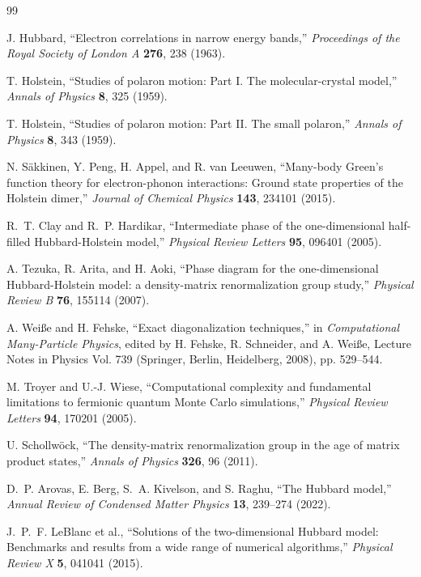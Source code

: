 \documentclass[
  reprint,
  amsmath,
  amssymb,
  aps,
  pra,
  nofootinbib,
  superscriptaddress,
  floatfix
]{revtex4-2}
\begin{document}
\begin{thebibliography}{99}

J. Hubbard,
``Electron correlations in narrow energy bands,''
\emph{Proceedings of the Royal Society of London A} \textbf{276}, 238 (1963).

T. Holstein,
``Studies of polaron motion: Part I. The molecular-crystal model,''
\emph{Annals of Physics} \textbf{8}, 325 (1959).

T. Holstein,
``Studies of polaron motion: Part II. The small polaron,''
\emph{Annals of Physics} \textbf{8}, 343 (1959).

N. S\"akkinen, Y. Peng, H. Appel, and R. van Leeuwen,
``Many-body Green's function theory for electron-phonon interactions: Ground state properties of the Holstein dimer,''
\emph{Journal of Chemical Physics} \textbf{143}, 234101 (2015).

R.~T. Clay and R.~P. Hardikar,
``Intermediate phase of the one-dimensional half-filled Hubbard-Holstein model,''
\emph{Physical Review Letters} \textbf{95}, 096401 (2005).

A. Tezuka, R. Arita, and H. Aoki,
``Phase diagram for the one-dimensional Hubbard-Holstein model: a density-matrix renormalization group study,''
\emph{Physical Review B} \textbf{76}, 155114 (2007).

A. Wei{\ss}e and H. Fehske,
``Exact diagonalization techniques,''
in \emph{Computational Many-Particle Physics},
edited by H. Fehske, R. Schneider, and A. Wei{\ss}e,
Lecture Notes in Physics Vol. 739 (Springer, Berlin, Heidelberg, 2008), pp. 529--544.

M. Troyer and U.-J. Wiese,
``Computational complexity and fundamental limitations to fermionic quantum Monte Carlo simulations,''
\emph{Physical Review Letters} \textbf{94}, 170201 (2005).

U. Schollw\"ock,
``The density-matrix renormalization group in the age of matrix product states,''
\emph{Annals of Physics} \textbf{326}, 96 (2011).

D.~P. Arovas, E. Berg, S.~A. Kivelson, and S. Raghu,
``The Hubbard model,''
\emph{Annual Review of Condensed Matter Physics} \textbf{13}, 239--274 (2022).

J.~P.~F. LeBlanc et al.,
``Solutions of the two-dimensional Hubbard model: Benchmarks and results from a wide range of numerical algorithms,''
\emph{Physical Review X} \textbf{5}, 041041 (2015).


\end{thebibliography}
\end{document}

